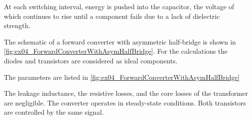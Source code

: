 \begin{solutionblock}

At each switching interval, energy is pushed into the capacitor, the voltage of which continues to rise until a component fails due to a lack of dielectric strength.    
\end{solutionblock}



The schematic of a forward converter with asymmetric half-bridge is shown in \autoref{fig:ex04_ForwardConverterWithAsymHalfBridge}. 
For the calculations the diodes and transistors are considered as ideal components.



The parameters are listed in \autoref{fig:ex04_ForwardConverterWithAsymHalfBridge}


The leakage inductance, the resistive losses, and the core losses of the transformer are negligible. 
The converter operates in steady-state conditions. Both transistors are controlled by the same signal.






